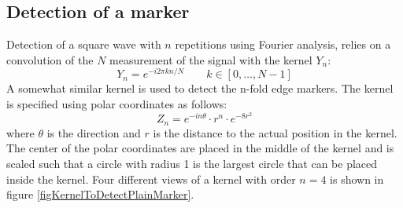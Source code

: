 \documentclass{article}
\begin{document}
\subsection{Detection of a marker} 
Detection of a square wave with $n$ repetitions using Fourier analysis, 
relies on a convolution of the $N$ measurement of the signal with the kernel $Y_n$: 
\[ 
Y_n = e^{-i 2 \pi k n / N} \qquad k \in [0, \ldots, N - 1] 
\] 
A somewhat similar kernel is used to detect the n-fold edge markers. 
The kernel is specified using polar coordinates as follows: 
\[ 
Z_n = e^{-i n \theta} \cdot r^n \cdot e^{-8 r^2} 
\] 
where $\theta$ is the direction and $r$ is the distance to the actual position in the kernel. 
The center of the polar coordinates are placed in the middle of the kernel and 
is scaled such that a circle with radius 1 is the largest circle that can be placed inside the kernel. 
Four different views of a kernel with order $n = 4$ is shown in 
figure \ref{figKernelToDetectPlainMarker}. 
 
\end{document}
